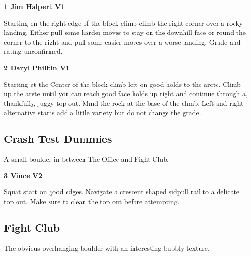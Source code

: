 \begin{multicols*}{2}
					\label{rt:Jim Halpert}\colorbox{green!20}{\textbf{1 Jim Halpert V1  \warn \warn }}
					\begin{adjustwidth}{0.5cm}{}
					\begin{minipage}{\linewidth}					
					Starting on the right edge of the block climb climb the right corner over a rocky landing. Either pull some harder moves to stay on the downhill face or round the corner to the right and pull some easier moves over a worse landing. Grade and rating unconfirmed.
					\end{minipage}
					\end{adjustwidth}

					\label{rt:Daryl Philbin}\colorbox{green!20}{\textbf{2 Daryl Philbin V1 \ding{72}    \warn }}
					\begin{adjustwidth}{0.5cm}{}
					\begin{minipage}{\linewidth}					
					Starting at the Center of the block climb left on good holds to the arete. Climb up the arete until you can reach good face holds up right and continue through a, thankfully, juggy top out. Mind the rock at the base of the climb. Left and right alternative starts add a little variety but do not change the grade.
					\end{minipage}
					\end{adjustwidth}
			\subsection*{Crash Test Dummies}\label{bf:Crash Test Dummies}
			\begin{minipage}{\columnwidth}
			A small boulder in between The Office and Fight Club.
			\end{minipage}
			
					\label{rt:Vince}\colorbox{green!20}{\textbf{3 Vince V2    }}
					\begin{adjustwidth}{0.5cm}{}
					\begin{minipage}{\linewidth}					
					Squat start on good edges. Navigate a crescent shaped sidpull rail to a delicate top out. Make sure to clean the top out before attempting.
					\end{minipage}
					\end{adjustwidth}
			\subsection*{Fight Club}\label{bf:Fight Club}
			\begin{minipage}{\columnwidth}
			The obvious overhanging boulder with an interesting bubbly texture.
			\end{minipage}
			

\end{multicols*}
